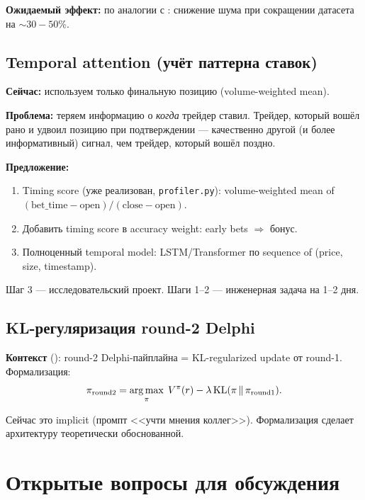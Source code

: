 \textbf{Ожидаемый эффект:} по аналогии с \citealt{attention_bc2024}:
снижение шума при сокращении датасета на ${\sim}30{-}50$\%.

\subsection{Temporal attention (учёт паттерна ставок)}

\textbf{Сейчас:} используем только финальную позицию (volume-weighted mean).

\textbf{Проблема:} теряем информацию о \emph{когда} трейдер ставил.
Трейдер, который вошёл рано и удвоил позицию при подтверждении ---
качественно другой (и более информативный) сигнал,
чем трейдер, который вошёл поздно.

\textbf{Предложение:}
\begin{enumerate}[nosep]
  \item Timing score (уже реализован, \texttt{profiler.py}):
    volume-weighted mean of $(\text{bet\_time} - \text{open}) / (\text{close} - \text{open})$.
  \item Добавить timing score в accuracy weight: early bets $\Rightarrow$ бонус.
  \item Полноценный temporal model: LSTM/Transformer по sequence of (price, size, timestamp).
\end{enumerate}

Шаг 3 --- исследовательский проект.
Шаги 1--2 --- инженерная задача на 1--2 дня.

\subsection{KL-регуляризация round-2 Delphi}

\textbf{Контекст} (\citealt{tiapkin2024demo}):
round-2 Delphi-пайплайна = KL-regularized update от round-1.
Формализация:
\[
\pi_{\mathrm{round2}} = \operatorname*{arg\,max}_{\pi}\; V^{\pi}(r) - \lambda\,\mathrm{KL}(\pi \,\|\, \pi_{\mathrm{round1}}).
\]

Сейчас это implicit (промпт <<учти мнения коллег>>).
Формализация сделает архитектуру теоретически обоснованной.

\section{Открытые вопросы для обсуждения}
\label{sec:questions}

